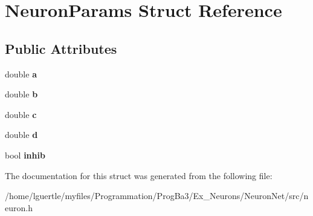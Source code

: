 \hypertarget{structNeuronParams}{}\section{Neuron\+Params Struct Reference}
\label{structNeuronParams}
\subsection*{Public Attributes}
\begin{DoxyCompactItemize}
\item 
\mbox{\label{structNeuronParams_a359703733f5e70bbd67d019e45a3bc85}} 
double {\bfseries a}
\item 
\mbox{\label{structNeuronParams_abd1bd37179d8efa115a8749f9252f77d}} 
double {\bfseries b}
\item 
\mbox{\label{structNeuronParams_a5df2ced2526eb84af2c8d2d34d9bfd93}} 
double {\bfseries c}
\item 
\mbox{\label{structNeuronParams_af2bd3bad3bc5532186cdc8d056a10cfb}} 
double {\bfseries d}
\item 
\mbox{\label{structNeuronParams_a751856d77a821cbd361b774d8653bbe6}} 
bool {\bfseries inhib}
\end{DoxyCompactItemize}


The documentation for this struct was generated from the following file\+:\begin{DoxyCompactItemize}
\item 
/home/lguertle/myfiles/\+Programmation/\+Prog\+Ba3/\+Ex\+\_\+\+Neurons/\+Neuron\+Net/src/neuron.\+h\end{DoxyCompactItemize}
